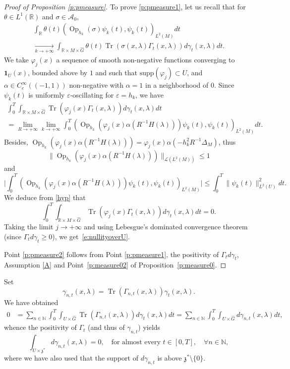 \documentclass[10pt]{amsart}
\let\mathcal\mathscr
\newcommand{\bun}{\mathbf{1}}
\DeclareMathOperator{\Op}{Op}
\DeclareMathOperator{\Tr}{Tr}
\theoremstyle{plain}
\theoremstyle{definition}
\let\eps\varepsilon
\def\R{{\mathbb R}}
\def\N{{\mathbb N}}
\newcommand{\Tend}[2]{\mathbin{\mathop{\longrightarrow}\limits_{#1\to#2}}}
\begin{document}
\begin{proof}[Proof of Proposition \ref{p:pmeasure}]
To prove \eqref{p:pmeasure1}, let us recall that for $\theta\in L^1(\R)$ and $\sigma\in{\mathcal A}_0$,
\begin{multline*}%
\int_{\R}\theta(t)(\Op_{h_k}(\sigma)\psi_k(t),\psi_k(t))_{L^2(M)}dt\\[-5pt]
\Tend{k}{ +\infty} \int_{\R\times M\times\widehat{G}}\theta(t)\Tr(\sigma(x,\lambda)\Gamma_t(x,\lambda))d\gamma_t(x,\lambda)dt.
\end{multline*}
We take $\varphi_j(x)$ a sequence of smooth non-negative functions converging to $\bun_{U}(x)$, bounded above by $1$ and such that $\text{supp}(\varphi_j)\subset U$, and $\alpha\in C_c^\infty((-1,1))$ non-negative with $\alpha=1$ in a neighborhood of $0$.
Since $\psi_k(t)$ is uniformly $\eps$-oscillating for $\eps=h_k$, we have
\begin{multline*}
\int_0^T \int _{\R\times M\times\widehat{G}} \Tr(\varphi_j(x)\Gamma_t(x,\lambda))d\gamma_t(x,\lambda)dt\\
=\lim_{R\to +\infty} \lim_{k\to +\infty}
\int_0^T \left(\Op_{h_k}(\varphi_j(x) \alpha (R^{-1} H(\lambda))) \psi_k(t),\psi_k(t)\right)_{L^2(M)} dt.
\end{multline*}
Besides, $\Op_{h_k}(\varphi_j(x) \alpha (R^{-1} H(\lambda)))= \varphi_j(x) \alpha(-h_k^2R^{-1} \Delta_M)$, thus
\[
\| \Op_{h_k}(\varphi_j(x) \alpha (R^{-1} H(\lambda)))\|_{\mathcal L(L^2(M))}\leq 1
\]
and
\[
\biggl| \int_0^T \left(\Op_{h_k}(\varphi_j(x) \alpha (R^{-1} H(\lambda))) \psi_k(t),\psi_k(t)\right)_{L^2(M)}\biggr| \leq
\int_0^T \|\psi_k(t)\| ^2_{L^2(U)} dt.
\]
We deduce from \eqref{hyp} that
\[
\int_0^T \int _{\R\times M\times\widehat{G}}\Tr(\varphi_j(x)\Gamma_t(x,\lambda))d\gamma_t(x,\lambda)dt=0.
\]
Taking the limit $j\to +\infty$ and using Lebesgue's dominated convergence theorem (since $\Gamma_td\gamma_t\geq 0$), we get~\eqref{e:nullityoverU}.

Point \eqref{p:pmeasure2}
follows from Point \eqref{p:pmeasure1}, the positivity of $\Gamma_td\gamma_t$, Assumption \eqref{A} and Point~\eqref{p:measure02} of Proposition~\ref{p:measure0}.
\end{proof}

Set
\[
\gamma_{n,t} (x,\lambda)= \Tr\left(\Gamma_{n,t}(x,\lambda)\right) \gamma_t(x,\lambda).
\]
We have obtained
\begin{align*}
0& =\sum_{n\in\N} \int_0^T \int_{U\times \widehat G} \Tr (\Gamma_{n,t}(x,\lambda)) d\gamma_t (x,\lambda)dt=\sum_{n\in\N} \int_0^T \int_{U\times \widehat G} d\gamma_{n,t} (x,\lambda)dt,
\end{align*}
whence the positivity of $\Gamma_t$ (and thus of $\gamma_{n,t}$) yields
\[
\int_{U\times \mathfrak z^*} d\gamma_{n,t} (x,\lambda)=0,\quad \text{for almost every } t\in [0,T],\quad \forall n\in\N,
\]
where we have also used that the support of $d\gamma_{n,t}$ is above $\mathfrak z^*\setminus \{0\}$.
\end{document}
